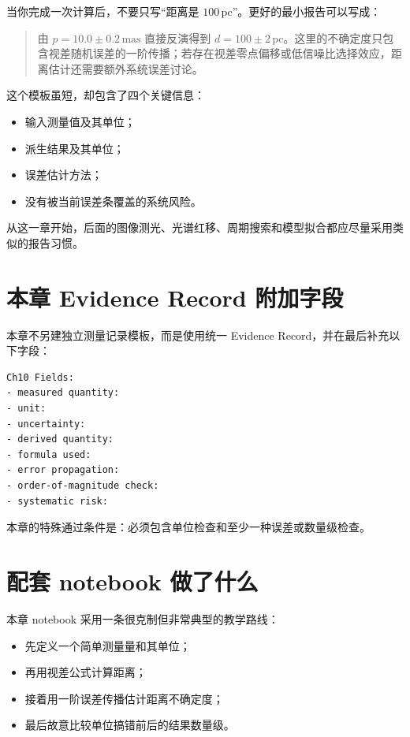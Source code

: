 当你完成一次计算后，不要只写“距离是 $100\,\mathrm{pc}$”。更好的最小报告可以写成：

\begin{quote}
由 $p=10.0\pm0.2\,\mathrm{mas}$ 直接反演得到 $d=100\pm2\,\mathrm{pc}$。这里的不确定度只包含视差随机误差的一阶传播；若存在视差零点偏移或低信噪比选择效应，距离估计还需要额外系统误差讨论。
\end{quote}

这个模板虽短，却包含了四个关键信息：

\begin{itemize}
    \item 输入测量值及其单位；
    \item 派生结果及其单位；
    \item 误差估计方法；
    \item 没有被当前误差条覆盖的系统风险。
\end{itemize}

从这一章开始，后面的图像测光、光谱红移、周期搜索和模型拟合都应尽量采用类似的报告习惯。

\section{本章 Evidence Record 附加字段}

本章不另建独立测量记录模板，而是使用统一 Evidence Record，并在最后补充以下字段：

\begin{examplebox}
\begin{lstlisting}[style=terminal]
Ch10 Fields:
- measured quantity:
- unit:
- uncertainty:
- derived quantity:
- formula used:
- error propagation:
- order-of-magnitude check:
- systematic risk:
\end{lstlisting}
\end{examplebox}

本章的特殊通过条件是：必须包含单位检查和至少一种误差或数量级检查。

\section{配套 notebook 做了什么}

本章 notebook 采用一条很克制但非常典型的教学路线：

\begin{itemize}
    \item 先定义一个简单测量量和其单位；
    \item 再用视差公式计算距离；
    \item 接着用一阶误差传播估计距离不确定度；
    \item 最后故意比较单位搞错前后的结果数量级。
\end{itemize}

